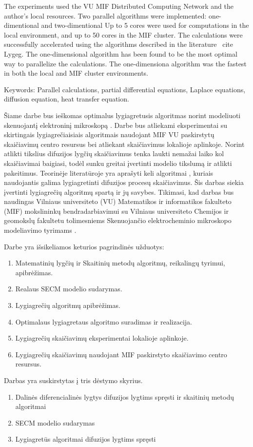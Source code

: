 \documentclass{VUMIFPSkursinis}
\begin{document}
The experiments used the VU MIF Distributed Computing Network and the author's local resources.
Two parallel algorithms were implemented: one-dimentional and two-dimentional
Up to 5 cores were used for computations in the local environment, and up to 50 cores in the MIF cluster.
The calculations were successfully accelerated using the algorithms described in the literature \ cite {Lygeg}.
The one-dimensional algorithm has been found to be the most optimal way to parallelize the calculations.
The one-dimensiona algorithm was the fastest in both the local and MIF cluster environments.


Keywords: Parallel calculations, partial differential equations, Laplace equations, diffusion equation, heat transfer equation.
\pagebreak

\tableofcontents

\pagebreak

Šiame darbe bus ieškomas optimalus lygiagretusis algoritmas norint modeliuoti skenuojantį elektroninį mikroskopą \cite{Astr}.
Darbe bus atliekami eksperimentai su skirtingais lygiagrečiaisiais algoritmais \cite{Lygeg} naudojant MIF VU paskirstytų skaičiavimų centro \cite{Mif} resursus bei atliekant skaičiavimus lokalioje aplinkoje.
Norint atlikti tikslius difuzijos lygčių skaičiavimus tenka laukti nemažai laiko \cite{Pois} kol skaičiavimai baigiasi, todėl sunku greitai įvertinti modelio tikslumą ir atlikti pakeitimus.
Teorinėje literatūroje yra aprašyti keli algoritmai \cite{Lygeg}, kuriais naudojantis galima lygiagretinti difuzijos procesų skaičiavimus.
Šis darbas siekia įvertinti lygiagrečių algoritmų spartą ir jų savybes.
Tikimasi, kad darbas bus naudingas Vilniaus universiteto (VU) Matematikos ir informatikos fakulteto (MIF) mokslininkų bendradarbiavimui su Vilniaus universiteto Chemijos ir geomokslų fakultetu tolimesniems Skenuojančio elektrocheminio mikroskopo modeliavimo tyrimams \cite{Astr}.


Darbe yra išsikeliamos keturios pagrindinės užduotys:
\begin{enumerate}
\item{Matematinių lygčių ir Skaitinių metodų algoritmų, reikalingų tyrimui, apibrėžimas.}
\item{Realaus SECM modelio sudarymas.}
\item{Lygiagrečių algoritmų apibrėžimas.}
\item{Optimalaus lygiagretaus algoritmo suradimas ir realizacija.}
\item{Lygiagrečių skaičiavimų eksperimentai lokalioje aplinkoje.}
\item{Lygiagrečių skaičiavimų naudojant MIF paskirstyto skaičiavimo centro resursus.}
\end{enumerate}
Darbas yra suskirstytas į tris dėstymo skyrius.
\begin{enumerate}
\item{Dalinės diferencialinės lygtys difuzijos lygtims spręsti ir skaitinių metodų algoritmai}
\item{SECM modelio sudarymas}
\item{Lygiagretūs algoritmai difuzijos lygtims spręsti}
\end{enumerate}
\end{document}
